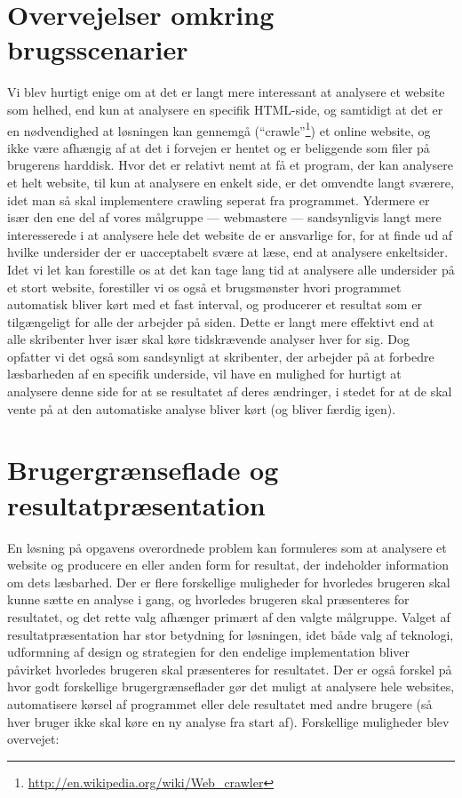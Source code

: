 \documentclass[a4paper,oneside]{memoir}
\begin{document}
\section{Overvejelser omkring brugsscenarier}
\label{brugsovervejelser}
Vi blev hurtigt enige om at det er langt mere interessant at analysere
et website som helhed, end kun at analysere en specifik HTML-side, og
samtidigt at det er en nødvendighed at løsningen kan gennemgå
(``crawle''\footnote{\url{http://en.wikipedia.org/wiki/Web_crawler}}) et online website, og ikke være afhængig af at det i
forvejen er hentet og er beliggende som filer på brugerens
harddisk. Hvor det er relativt nemt at få et program, der kan
analysere et helt website, til kun at analysere en enkelt side, er det
omvendte langt sværere, idet man så skal implementere crawling seperat
fra programmet. Ydermere er især den ene del af vores målgruppe ---
webmastere --- sandsynligvis langt mere interesserede i at
analysere hele det website de er ansvarlige for, for at finde ud af
hvilke undersider der er uacceptabelt svære at læse, end at analysere
enkeltsider. Idet vi let kan forestille os at det kan tage lang
tid at analysere alle undersider på et stort website, forestiller vi
os også et brugsmønster hvori programmet automatisk bliver kørt med et
fast interval, og producerer et resultat som er tilgængeligt for alle
der arbejder på siden. Dette er langt mere effektivt end at alle
skribenter hver især skal køre tidskrævende analyser hver for sig. Dog
opfatter vi det også som sandsynligt at skribenter, der arbejder på at
forbedre læsbarheden af en specifik underside, vil have en mulighed
for hurtigt at analysere denne side for at se resultatet af deres
ændringer, i stedet for at de skal vente på at den automatiske analyse
bliver kørt (og bliver færdig igen).

\section{Brugergrænseflade og resultatpræsentation}
\label{brugergraenseflade}
En løsning på opgavens overordnede problem kan formuleres som at
analysere et website og producere en eller anden form for resultat,
der indeholder information om dets læsbarhed. Der er flere forskellige
muligheder for hvorledes brugeren skal kunne sætte en analyse i gang,
og hvorledes brugeren skal præsenteres for resultatet, og det rette
valg afhænger primært af den valgte målgruppe. Valget af
resultatpræsentation har stor betydning for løsningen, idet både valg
af teknologi, udformning af design og strategien for den endelige
implementation bliver påvirket hvorledes brugeren skal præsenteres for
resultatet. Der er også forskel på hvor godt forskellige
brugergrænseflader gør det muligt at analysere hele websites,
automatisere kørsel af programmet eller dele resultatet med andre
brugere (så hver bruger ikke skal køre en ny analyse fra start
af). Forskellige muligheder blev overvejet:
\end{document}
